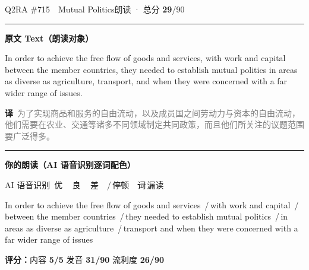 \documentclass[11pt]{article}
\newcommand{\sfull}[1]{\textcolor{cFix}{\bfseries #1}}     %
\newcommand{\spart}[1]{\textcolor{cPartial}{\bfseries #1}} %
\newcommand{\ptesub}[1]{%
  \par\needspace{2\baselineskip}\smallskip
  {\color{cAccent}\rule[-0.2ex]{3pt}{1.05em}}\hspace{6pt}%
  {\bfseries\color{cHead}#1}\par\nopagebreak\smallskip}
\newcommand{\sg}[1]{\textcolor{cSpkGood}{#1}}   %
\newcommand{\sy}[1]{\textcolor{cSpkOk}{#1}}     %
\newcommand{\pse}{{\color{gray}\,/\,}}          %
\newcommand{\asrlegend}{{\footnotesize\color{gray}AI 语音识别\quad
  {\color{cSpkGood}\textbullet}\,优\ \ {\color{cSpkOk}\textbullet}\,良\ \
  {\color{cSpkBad}\textbullet}\,差\ \ {\color{gray}/}\,停顿\ \
  {\color{cSpkBad}\sout{词}}\,漏读}}
\newcommand{\zh}[1]{{\footnotesize\textcolor{cNote}{\textbf{译}}\ \textcolor{gray}{#1}}}
\begin{document}
\begin{qblock}{Q2\quad RA \#715\ \ Mutual Politics}{朗读 · 总分 \textcolor{cAccent}{\bfseries 29}/90}
\ptesub{原文 Text（朗读对象）}
\begin{promptbox}
In order to achieve the free flow of goods and services, with work and capital between the member countries, they needed to establish mutual politics in areas as diverse as agriculture, transport, and when they were concerned with a far wider range of issues.
\end{promptbox}
\zh{为了实现商品和服务的自由流动，以及成员国之间劳动力与资本的自由流动，他们需要在农业、交通等诸多不同领域制定共同政策，而且他们所关注的议题范围要广泛得多。}
\ptesub{你的朗读（AI 语音识别逐词配色）}
\asrlegend
\begin{asrbox}
\sg{In} \sg{order} \sg{to} \sg{achieve} \sg{the} \sg{free} \sg{flow} \sg{of} \sy{goods} \sg{and} \sg{services} \pse \sg{with} \sg{work} \sg{and} \sg{capital} \pse \sg{between} \sg{the} \sg{member} \sg{countries} \pse \sg{they} \sg{needed} \sg{to} \sg{establish} \sg{mutual} \sy{politics} \pse \sg{in} \sg{areas} \sg{as} \sg{diverse} \sg{as} \sg{agriculture} \pse \sy{transport} \sg{and} \sg{when} \sg{they} \sg{were} \sg{concerned} \sg{with} \sy{a} \sg{far} \sg{wider} \sg{range} \sg{of} \sy{issues}
\end{asrbox}
\smallskip
{\small\textbf{评分：}内容 \sfull{5/5} \quad\textperiodcentered\quad 发音 \spart{31/90} \quad\textperiodcentered\quad 流利度 \spart{26/90}}\quad{\footnotesize\color{gray}（用时 00:59）}
\end{qblock}
\end{document}
